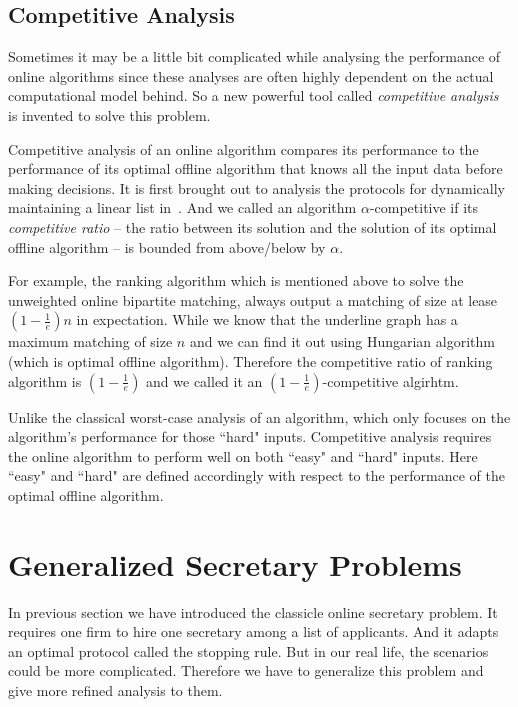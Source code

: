 \subsection{Competitive Analysis}

Sometimes it may be a little bit complicated while analysing the performance 
of online algorithms since these analyses are often highly dependent on the
actual computational model behind. So a new powerful tool called
\emph{competitive analysis} is invented to solve this problem.

Competitive analysis of an online algorithm compares its performance to
the performance of its optimal offline algorithm that knows all the input 
data before making decisions. 
It is first brought out to analysis the protocols for dynamically
maintaining a linear list in~\cite{sleator1985amortized}.
And we called an algorithm 
$\alpha$-competitive if its \emph{competitive ratio} 
-- the ratio between its solution and the solution of its optimal offline
algorithm -- is bounded from above/below by $\alpha$.

For example, the ranking algorithm which is mentioned above to solve the
unweighted online bipartite matching, always output a matching of size
at lease $(1 - \frac{1}{e})n$ in expectation. While we know that the
underline graph has a maximum matching of size $n$ and we can find it out
using Hungarian algorithm (which is optimal offline algorithm). 
Therefore the competitive ratio of ranking algorithm is $(1 - \frac{1}{e})$
and we called it an $(1 - \frac{1}{e})$-competitive algirhtm.

Unlike the classical worst-case analysis of an algorithm, which only 
focuses on the algorithm's performance for those ``hard" inputs. Competitive
analysis requires the online algorithm to perform well on both ``easy" and
``hard" inputs. Here ``easy" and ``hard" are defined accordingly with
respect to the performance of the optimal offline algorithm.

\section{Generalized Secretary Problems}

In previous section we have introduced the classicle online secretary
problem. It requires one firm to hire one secretary among 
a list of applicants. And it adapts an optimal protocol called the
stopping rule. But in our real life, the scenarios could be more
complicated. Therefore we have to generalize this problem and give more
refined analysis to them.

